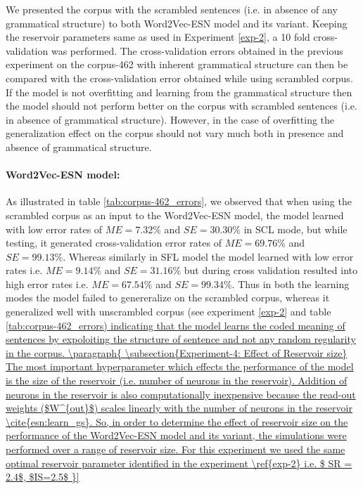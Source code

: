We presented the corpus with the scrambled sentences (i.e. in absence of any grammatical structure) to both Word2Vec-ESN model and its variant. Keeping the reservoir parameters same as used in Experiment \ref{exp-2}, a 10 fold cross-validation was performed. The cross-validation errors obtained in the previous experiment on the corpus-462 with inherent grammatical structure can then be compared with the cross-validation error obtained while using scrambled corpus. If the model is not overfitting and learning from the grammatical structure then the model should not perform better on the corpus with scrambled sentences (i.e. in absence of grammatical structure). However, in the case of overfitting the generalization effect on the corpus should not vary much both in presence and absence of grammatical structure.

\paragraph{Word2Vec-ESN model: } As illustrated in table \ref{tab:corpus-462_errors}, we observed that when using the scrambled corpus as an input to the Word2Vec-ESN model, the model learned with low error rates of $ME = 7.32 \%$ and $SE = 30.30 \%$ in SCL mode, but while testing, it generated cross-validation error rates of $ME = 69.76 \% $ and $SE = 99.13 \%$. Whereas similarly in SFL model the model learned with low error rates i.e. $ME = 9.14 \%$ and $SE = 31.16 \%$  but during cross validation resulted into high error rates i.e. $ME = 67.54 \%$ and $SE = 99.34 \%$. Thus in both the learning modes the model failed to genereralize on the scrambled corpus, whereas it generalized well with unscrambled corpus (see experiment \ref{exp-2} and table \ref{tab:corpus-462_errors) indicating that the model learns the coded meaning of sentences by expoloiting the structure of sentence and not any random regularity in the corpus.

\paragraph{

\subsection{Experiment-4: Effect of Reservoir size}

The most important hyperparameter which effects the performance of the model is the size of the reservoir (i.e. number of neurons in the reservoir). Addition of neurons in the reservoir is also computationally inexpensive because the read-out weights ($W^{out}$) scales linearly with the number of neurons in the reservoir \cite{esn:learn_gs}. So, in order to determine the effect of reservoir size on the performance of the Word2Vec-ESN model and its variant, the simulations were performed over a range of reservoir size. For this experiment we used the same optimal reservoir parameter identified in the experiment \ref{exp-2} i.e. $ SR = 2.4$, $IS=2.5$

}}
